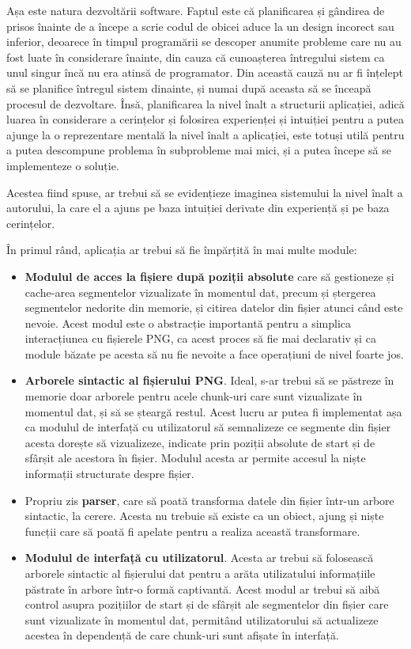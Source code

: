 \documentclass[a4paper,12pt]{report}
\begin{document}
Așa este natura dezvoltării software.
Faptul este că planificarea și gândirea de prisos înainte de a începe a scrie codul
de obicei aduce la un design incorect sau inferior, deoarece în timpul programării
se descoper anumite probleme care nu au fost luate în considerare înainte,
din cauza că cunoașterea întregului sistem ca unul singur încă nu era atinsă de programator.
Din această cauză nu ar fi înțelept să se planifice întregul sistem
dinainte, și numai după aceasta să se înceapă procesul de dezvoltare.
Însă, planificarea la nivel înalt a structurii aplicației,
adică luarea în considerare a cerințelor și folosirea experienței și intuiției pentru
a putea ajunge la o reprezentare mentală la nivel înalt a aplicației,
este totuși utilă pentru a putea descompune problema în subprobleme mai mici,
și a putea începe să se implementeze o soluție.
 
Acestea fiind spuse, ar trebui să se evidențieze imaginea sistemului la nivel înalt a autorului,
la care el a ajuns pe baza intuiției derivate din experiență și pe baza cerințelor.

În primul rând, aplicația ar trebui să fie împărțită în mai multe module:
\begin{itemize}
  \item 
  \textbf{Modulul de acces la fișiere după poziții absolute} care
  să gestioneze și cache-area segmentelor vizualizate în momentul dat,
  precum și ștergerea segmentelor nedorite din memorie,
  și citirea datelor din fișier atunci când este nevoie.
  Acest modul este o abstracție importantă pentru a simplica interacțiunea cu
  fișierele PNG, ca acest proces să fie mai declarativ și ca module băzate pe
  acesta să nu fie nevoite a face operațiuni de nivel foarte jos.

  \item
  \textbf{Arborele sintactic al fișierului PNG}.
  Ideal, s-ar trebui să se păstreze în memorie doar arborele pentru acele chunk-uri
  care sunt vizualizate în momentul dat, și să se șteargă restul.
  Acest lucru ar putea fi implementat așa ca modulul de interfață cu utilizatorul să semnalizeze
  ce segmente din fișier acesta dorește să vizualizeze, indicate prin poziții absolute 
  de start și de sfârșit ale acestora în fișier.
  Modulul acesta ar permite accesul la niște informații structurate despre fișier.

  \item
  Propriu zis \textbf{parser}, care să poată transforma
  datele din fișier într-un arbore sintactic, la cerere.
  Acesta nu trebuie să existe ca un obiect, ajung și niște funcții care să poată
  fi apelate pentru a realiza această transformare.

  \item
  \textbf{Modulul de interfață cu utilizatorul}.
  Acesta ar trebui să folosească arborele sintactic al fișierului dat pentru
  a arăta utilizatului informațiile păstrate în arbore într-o formă captivantă.
  Acest modul ar trebui să aibă control asupra pozițiilor de start și de sfârșit
  ale segmentelor din fișier care sunt vizualizate în momentul dat, 
  permitând utilizatorului să actualizeze acestea în dependență 
  de care chunk-uri sunt afișate în interfață.
\end{itemize}
\end{document}
